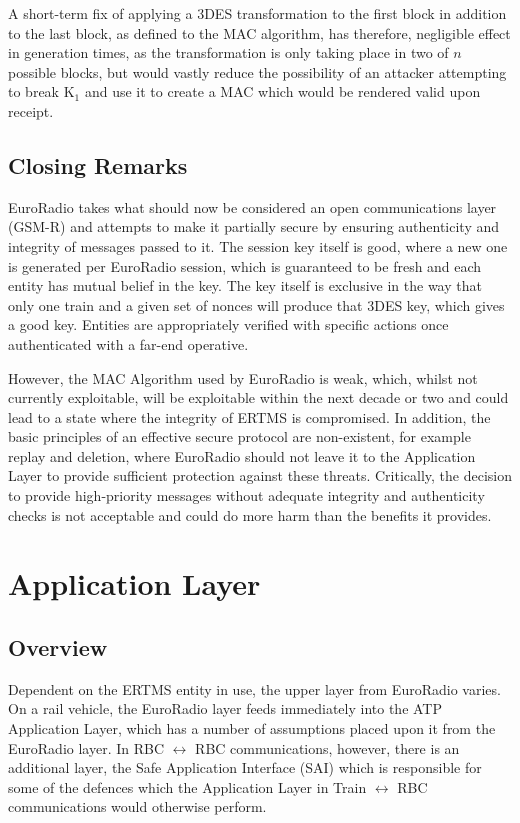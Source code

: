 \documentclass[twoside,11pt,a4paper]{article}
\begin{document}
A short-term fix of applying a 3DES transformation to the first block in addition to the last block, as defined to the MAC algorithm, has therefore, negligible effect in generation times, as the transformation is only taking place in two of $n$ possible blocks, but would vastly reduce the possibility of an attacker attempting to break K$_1$ and use it to create a MAC which would be rendered valid upon receipt.

\subsection{Closing Remarks}
EuroRadio takes what should now be considered an open communications layer (GSM-R) and attempts to make it partially secure by ensuring authenticity and integrity of messages passed to it. The session key itself is good, where a new one is generated per EuroRadio session, which is guaranteed to be fresh and each entity has mutual belief in the key. The key itself is exclusive in the way that only one train and a given set of nonces will produce that 3DES key, which gives a good key. Entities are appropriately verified with specific actions once authenticated with a far-end operative.

However, the MAC Algorithm used by EuroRadio is weak, which, whilst not currently exploitable, will be exploitable within the next decade or two and could lead to a state where the integrity of ERTMS is compromised. In addition, the basic principles of an effective secure protocol are non-existent, for example replay and deletion, where EuroRadio should not leave it to the Application Layer to provide sufficient protection against these threats. Critically, the decision to provide high-priority messages without adequate integrity and authenticity checks is not acceptable and could do more harm than the benefits it provides.

\clearpage

\section{Application Layer}
\subsection{Overview}
Dependent on the ERTMS entity in use, the upper layer from EuroRadio varies. On a rail vehicle, the EuroRadio layer feeds immediately into the ATP Application Layer, which has a number of assumptions placed upon it from the EuroRadio layer. In RBC $\leftrightarrow$ RBC communications, however, there is an additional layer, the Safe Application Interface (SAI) which is responsible for some of the defences which the Application Layer in Train $\leftrightarrow$ RBC communications would otherwise perform.
\end{document}
